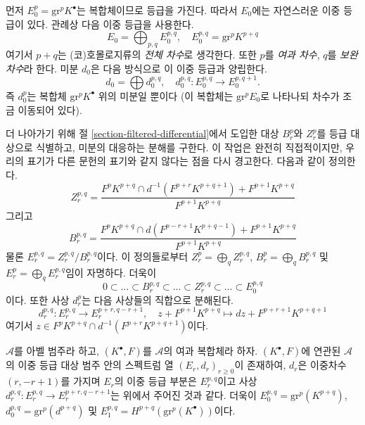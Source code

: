 \medskip\noindent
먼저 $E_0^p = \text{gr}^p K^\bullet$는 복합체이므로 등급을 가진다.
따라서 $E_0$에는 자연스러운 이중 등급이 있다. 관례상 다음 이중 등급을
사용한다.
$$
E_0 = \bigoplus\nolimits_{p, q} E_0^{p, q},
\quad
E_0^{p, q} = \text{gr}^p K^{p + q}
$$
여기서 $p + q$는 (코)호몰로지류의 {\it 전체 차수}로 생각한다.
또한 $p$를 {\it 여과 차수}, $q$를 {\it 보완 차수}라 한다.
미분 $d_0$은 다음 방식으로 이 이중 등급과 양립한다.
$$
d_0  = \bigoplus d_0^{p, q},
\quad
d_0^{p, q} : E_0^{p, q} \to E_0^{p, q + 1}.
$$
즉 $d_0^p$는 복합체 $\text{gr}^p K^\bullet$ 위의 미분일 뿐이다
(이 복합체는 $\text{gr}^pE_0$로 나타나되 차수가 조금 이동되어 있다).

\medskip\noindent
더 나아가기 위해 절 \ref{section-filtered-differential}에서 도입한
대상 $B_r^p$와 $Z_r^p$를 등급 대상으로 식별하고, 미분의 대응하는
분해를 구한다. 이 작업은 완전히 직접적이지만, 우리의 표기가 다른
문헌의 표기와 같지 않다는 점을 다시 경고한다. 다음과 같이 정의한다.
$$
Z_r^{p, q} =
\frac{F^pK^{p + q} \cap d^{-1}(F^{p + r}K^{p + q + 1}) + F^{p + 1}K^{p + q}}
{F^{p + 1}K^{p + q}}
$$
그리고
$$
B_r^{p, q} =
\frac{F^pK^{p + q} \cap d(F^{p - r + 1}K^{p + q - 1}) + F^{p + 1}K^{p + q}}
{F^{p + 1}K^{p + q}}
$$
물론 $E_r^{p, q} = Z_r^{p, q}/B_r^{p, q}$이다. 이 정의들로부터
$Z_r^p = \bigoplus_q Z_r^{p, q}$,
$B_r^p = \bigoplus_q B_r^{p, q}$ 및
$E_r^p = \bigoplus_q E_r^{p, q}$임이 자명하다. 더욱이
$$
0 \subset \ldots \subset B_r^{p, q} \subset
\ldots
\subset Z_r^{p, q} \subset \ldots \subset E_0^{p, q}
$$
이다. 또한 사상 $d_r^p$는 다음 사상들의 직합으로 분해된다.
$$
d_r^{p, q} : E_r^{p, q} \longrightarrow E_r^{p + r, q - r + 1},
\quad
z + F^{p + 1}K^{p + q}
\mapsto
dz + F^{p + r + 1}K^{p + q + 1}
$$
여기서 $z \in F^pK^{p + q} \cap d^{-1}(F^{p + r}K^{p + q + 1})$이다.

\begin{lemma}
\label{lemma-spectral-sequence-filtered-complex}
$\mathcal{A}$를 아벨 범주라 하고, $(K^\bullet, F)$를 $\mathcal{A}$의
여과 복합체라 하자. $(K^\bullet, F)$에 연관된 $\mathcal{A}$의 이중
등급 대상 범주 안의 스펙트럼 열 $(E_r, d_r)_{r \geq 0}$이 존재하여,
$d_r$은 이중차수 $(r, - r + 1)$를 가지며 $E_r$의 이중 등급 부분은
$E_r^{p, q}$이고 사상
$d_r^{p, q} : E_r^{p, q} \to E_r^{p + r, q - r + 1}$는 위에서 주어진
것과 같다. 더욱이 $E_0^{p, q} = \text{gr}^p(K^{p + q})$,
$d_0^{p, q} = \text{gr}^p(d^{p + q})$ 및
$E_1^{p, q} = H^{p + q}(\text{gr}^p(K^\bullet))$이다.
\end{lemma}

